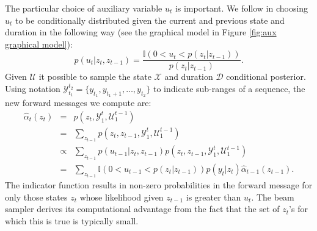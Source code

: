
The particular choice of auxiliary variable $u_t$ is important.  We follow  \cite{vanGael2008} in choosing $u_t$ to be conditionally distributed given the current and previous state and duration in the following way (see the graphical model in Figure \ref{fig:aux graphical model}):
\begin{equation}
    \label{eqn:slice}
    p(u_t | z_t, z_{t-1}) = 
    \frac
    {\mathbb{I}(0 < u_t < p(z_t | z_{t-1}))} 
    {p(z_t | z_{t-1})}.
\end{equation}
Given $\mathcal{U}$ it possible to sample the state $\mathcal{X}$ and duration $\mathcal{D}$ conditional posterior. 
Using notation $\mathcal{Y}_{t_1}^{t_2} = \{y_{t_1}, y_{t_1+1}, \ldots,y_{t_2}\}$  to indicate sub-ranges of a sequence, the new forward messages we compute are:
\begin{eqnarray}
   \hat{\alpha}_t(z_t) &=& 
   p(z_t, \mathcal{Y}_1^t , \mathcal{U}_1^{t-1})   \label{eqn:scaled forward} \\
   &=& 
   \sum_{z_{t-1}}
   p(z_t, z_{t-1} , \mathcal{Y}_1^t , \mathcal{U}_1^{t-1}) \nonumber \\
   &\propto& 
   \sum_{z_{t-1}}
   p(u_{t-1} | z_t, z_{t-1})
   p(z_t, z_{t-1} , \mathcal{Y}_1^t, \mathcal{U}_1^{t-1}) \nonumber \\
   &=& 
   \sum_{z_{t-1}}
   \mathbb{I}(0 < u_{t-1} < p(z_t | z_{t-1}))
   p(y_t|z_t) \hat{\alpha}_{t-1}(z_{t-1}) \nonumber.
\end{eqnarray}
The indicator function results in non-zero probabilities in the forward message for only those states $z_t$ whose likelihood given $z_{t-1}$ is greater than $u_t$. The beam sampler derives its computational advantage from the fact that the set of $z_t$'s for which this is true is typically small. 
